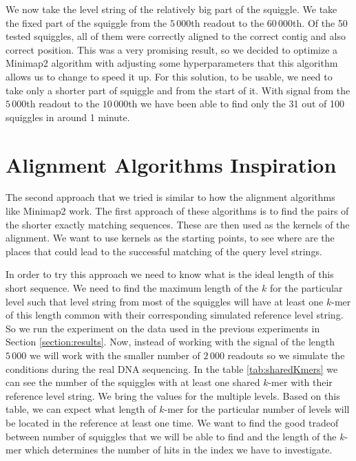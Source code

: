 We now take the level string of the relatively big part of the squiggle. We take the
fixed part of the squiggle from the $5\,000$th readout to the $60\,000$th. Of the 50
tested squiggles, all of them were correctly aligned to the correct contig and also
correct position. This was a very promising result, so we decided to optimize a
Minimap2 algorithm with adjusting some hyperparameters that this algorithm allows us
to change to speed it up. For this solution, to be usable, we need to take only
a shorter part of squiggle and from the start of it. With signal from the $5\,000$th
readout to the $10\,000$th we have been able to find only the 31 out of 100 squiggles
in around 1 minute.

\section{Alignment Algorithms Inspiration}

The second approach that we tried is similar to how the alignment algorithms like
Minimap2 work. The first approach of these algorithms is to find the pairs of the shorter
exactly matching sequences. These are then used as the kernels of the alignment. We want
to use kernels as the starting points, to see where are the places that could lead to the
successful matching of the query level strings.

In order to try this approach we need to know what is the ideal length of this short
sequence. We need to find the maximum length of the $k$ for the particular level
such that level string from most of the squiggles will have at least one $k$-mer
of this length common with their corresponding simulated reference level string.
So we run the experiment on the data used in the previous experiments in Section
\ref{section:results}. Now, instead of working with the signal of the length
$5\,000$ we will work with the smaller number of $2\,000$ readouts so we
simulate the conditions during the real DNA sequencing. In the table \ref{tab:sharedKmers}
we can see the number of the squiggles with at least one shared $k$-mer with their reference
level string. We bring the values for the multiple levels. Based on this table,
we can expect what length of $k$-mer for the particular number of levels will be located
in the reference at least one time. We want to find the good tradeof between number of
squiggles that we will be able to find and the length of the $k$-mer which determines
the number of hits in the index we have to investigate.

